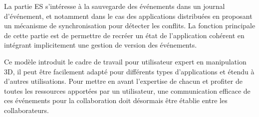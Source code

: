 La partie \gls{ES} s'intéresse à la sauvegarde des événements dans un journal 
d'événement, et notamment dans le cas des applications distribuées en proposant 
un mécanisme de synchronisation pour détecter les conflits. La fonction principale 
de cette partie est de permettre de recréer un état de l'application cohérent en 
intégrant implicitement une gestion de version des événements.

Ce modèle introduit le cadre de travail pour utilisateur expert en manipulation 3D, il 
peut être facilement adapté pour différents types d'applications et étendu à 
d'autres utilisations. 
Pour mettre en avant l'expertise de chacun et profiter de 
toutes les ressources apportées par un utilisateur, une communication efficace de 
ces événements pour la collaboration doit désormais être établie entre les 
collaborateurs.